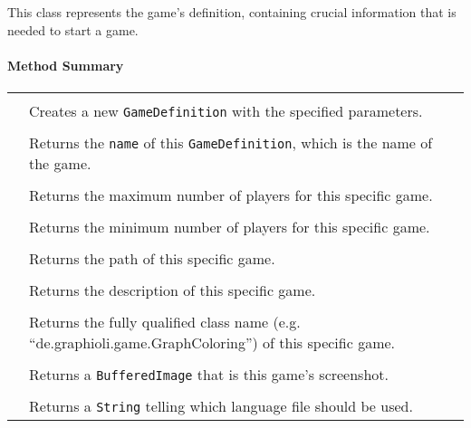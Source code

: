\pagebreak

This class represents the game's definition, containing crucial information that is needed to start a game.

\centerdash
\paragraph*{Method Summary}
\paragraph*{}
\begin{longtable}{Lp{10cm}}
	\startmethodtable
	 \\
	& Creates a new \texttt{GameDefinition} with the specified parameters. \\
	 \\
	& Returns the \texttt{name} of this \texttt{GameDefinition}, which is the name of the game. \\
	 \\
	& Returns the maximum number of players for this specific game. \\
	 \\
	& Returns the minimum number of players for this specific game. \\
	 \\
	& Returns the path of this specific game. \\
	 \\
	& Returns the description of this specific game. \\
	 \\
	& Returns the fully qualified class name (e.g. ``de.graphioli.game.GraphColoring'') of this specific game. \\
	 \\
	& Returns a \texttt{BufferedImage} that is this game's screenshot. \\
	 \\
	& Returns a \texttt{String} telling which language file should be used. \\

\end{longtable}

